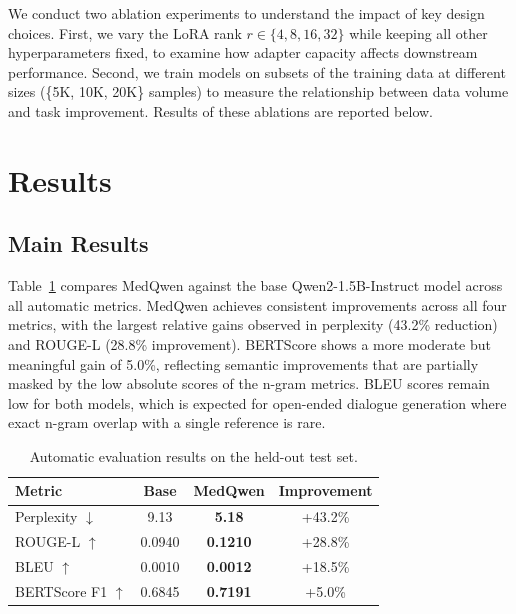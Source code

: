 \documentclass[11pt,a4paper]{article}
\begin{document}
We conduct two ablation experiments to understand the impact of key design choices. First, we vary the LoRA rank $r \in \{4, 8, 16, 32\}$ while keeping all other hyperparameters fixed, to examine how adapter capacity affects downstream performance. Second, we train models on subsets of the training data at different sizes (\{5K, 10K, 20K\} samples) to measure the relationship between data volume and task improvement. Results of these ablations are reported below.

\section{Results}
\label{sec:results}

\subsection{Main Results}

Table~\ref{tab:main_results} compares MedQwen against the base Qwen2-1.5B-Instruct model across all automatic metrics. MedQwen achieves consistent improvements across all four metrics, with the largest relative gains observed in perplexity (43.2\% reduction) and ROUGE-L (28.8\% improvement). BERTScore shows a more moderate but meaningful gain of 5.0\%, reflecting semantic improvements that are partially masked by the low absolute scores of the n-gram metrics. BLEU scores remain low for both models, which is expected for open-ended dialogue generation where exact n-gram overlap with a single reference is rare.

\begin{table}[ht]
\centering
\caption{Automatic evaluation results on the held-out test set.}
\label{tab:main_results}
\begin{tabular}{lccc}
\toprule
\textbf{Metric} & \textbf{Base} & \textbf{MedQwen} & \textbf{Improvement} \\
\midrule
Perplexity $\downarrow$ & 9.13 & \textbf{5.18} & +43.2\% \\
ROUGE-L $\uparrow$ & 0.0940 & \textbf{0.1210} & +28.8\% \\
BLEU $\uparrow$ & 0.0010 & \textbf{0.0012} & +18.5\% \\
BERTScore F1 $\uparrow$ & 0.6845 & \textbf{0.7191} & +5.0\% \\
\bottomrule
\end{tabular}
\end{table}
\end{document}
